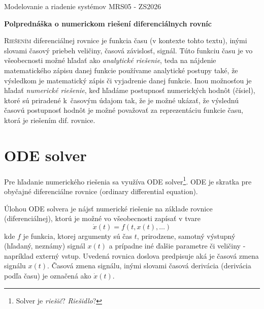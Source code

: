 \documentclass[a4paper, 10pt, ]{article}
\def\oznacenieCasti{MRS05 - ZS2026}
\begin{document}
\fontsize{12pt}{22pt}\selectfont

\centerline{\textsf{Modelovanie a riadenie systémov} \hfill \textsf{\oznacenieCasti}}

\fontsize{18pt}{22pt}\selectfont





\begin{flushleft}
	\textbf{\textsf{Polprednáška o numerickom riešení diferenciálnych rovníc}}
\end{flushleft}





\normalsize

\bigskip

{\hypersetup{hidelinks}

\tableofcontents

}

\bigskip

\vspace{18pt}



\noindent
\lettrine[lines=3, nindent=0pt]{R}{iešením} diferenciálnej rovnice je funkcia času (v kontexte tohto textu), inými slovami časový priebeh veličiny, časová závislosť, signál. Túto funkciu času je vo všeobecnosti možné hľadať ako \emph{analytické riešenie}, teda na nájdenie matematického zápisu danej funkcie používame analytické postupy také, že výsledkom je matematický zápis či vyjadrenie danej funkcie. Inou možnosťou je hľadať \emph{numerické riešenie}, keď hľadáme postupnosť numerických hodnôt (čísiel), ktoré sú priradené k~časovým údajom tak, že je možné ukázať, že výslednú časovú postupnosť hodnôt je možné považovať za reprezentáciu funkcie času, ktorá je riešením dif. rovnice.












\section{ODE solver}


Pre hľadanie numerického riešenia sa využíva ODE solver\footnote{Solver je \emph{riešič}?  \emph{Riešidlo}?}. ODE je skratka pre obyčajné diferenciálne rovnice (ordinary differential equation).

Úlohou ODE solvera je nájsť numerické riešenie na základe rovnice (diferenciálnej), ktorú je možné vo všeobecnosti zapísať v tvare
\begin{equation} \label{fPreODESolver}
    \dot x(t) = f \left( t, x(t), \ldots \right)
\end{equation}
kde $f$ je funkcia, ktorej argumenty sú čas $t$, prirodzene, samotný výstupný (hľadaný, neznámy) signál $x(t)$ a prípadne iné ďalšie parametre či veličiny - napríklad externý vstup. Uvedená rovnica doslova predpisuje aká je časová zmena signálu $x(t)$. Časová zmena signálu, inými slovami časová derivácia (derivácia podľa času) je označená ako $\dot x(t)$.
\end{document}
